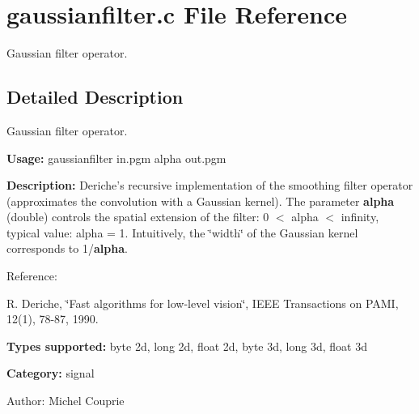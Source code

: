 \section{gaussianfilter.c File Reference}
\label{gaussianfilter_8c}
Gaussian filter operator.  




\label{_details}
\subsection{Detailed Description}
Gaussian filter operator. 

{\bf Usage:} gaussianfilter in.pgm alpha out.pgm

{\bf Description:} Deriche's recursive implementation of the smoothing filter operator (approximates the convolution with a Gaussian kernel). The parameter {\bf alpha} (double) controls the spatial extension of the filter: 0 $<$ alpha $<$ infinity, typical value: alpha = 1. Intuitively, the \char`\"{}width\char`\"{} of the Gaussian kernel corresponds to 1/{\bf alpha}.

Reference:\par
 [Der90] R. Deriche, \char`\"{}Fast algorithms for low-level vision\char`\"{}, IEEE Transactions on PAMI, 12(1), 78-87, 1990.\par


{\bf Types supported:} byte 2d, long 2d, float 2d, byte 3d, long 3d, float 3d

{\bf Category:} signal

\begin{Desc}
\item[Author:]Michel Couprie \end{Desc}
